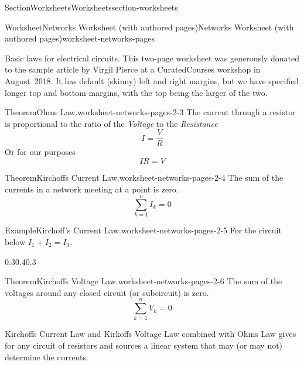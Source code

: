 \documentclass[oneside,10pt,]{article}
\numberwithin{equation}{section}
\begin{document}
\begin{sectionptx}{Section}{Worksheets}{}{Worksheets}{}{}{section-worksheets}
\begin{worksheet-subsection}{Worksheet}{Networks Worksheet (with authored pages)}{}{Networks Worksheet (with authored pages)}{}{}{worksheet-networks-pages}
\begin{introduction}{Basic laws for electrical circuits.}%
This two-page worksheet was generously donated to the sample article by Virgil Pierce at a CuratedCourses workshop in August~2018.  It has default (skinny) left and right margins, but we have specified longer top and bottom margins, with the top being the larger of the two.%
\begin{theorem}{Theorem}{Ohms Law.}{}{worksheet-networks-pages-2-3}%
The current through a resistor is proportional to the ratio of the \emph{Voltage} to the \emph{Resistance}%
\begin{equation*}
I = \frac{V}{R} 
\end{equation*}
Or for our purposes%
\begin{equation*}
I R = V 
\end{equation*}
%
\end{theorem}
\begin{theorem}{Theorem}{Kirchoffs Current Law.}{}{worksheet-networks-pages-2-4}%
The sum of the currents in a network meeting at a point is zero.%
\begin{equation*}
\sum_{k=1}^n I_k = 0 
\end{equation*}
%
\end{theorem}
\begin{example}{Example}{Kirchoff's Current Law.}{worksheet-networks-pages-2-5}%
For the circuit below \(I_1 + I_2 = I_3 \).%
\begin{image}{0.3}{0.4}{0.3}{}%
%
\end{image}%
\end{example}
\begin{theorem}{Theorem}{Kirchoffs Voltage Law.}{}{worksheet-networks-pages-2-6}%
The sum of the voltages around any closed circuit (or subcircuit) is zero.%
\begin{equation*}
\sum_{k=1}^n V_k = 0 
\end{equation*}
%
\end{theorem}
Kirchoffs Current Law and Kirkoffs Voltage Law combined with Ohms Law gives for any circuit of resistors and sources a linear system that may (or may not) determine the currents.%

\end{introduction}
\end{worksheet-subsection}
\end{sectionptx}
\end{document}
